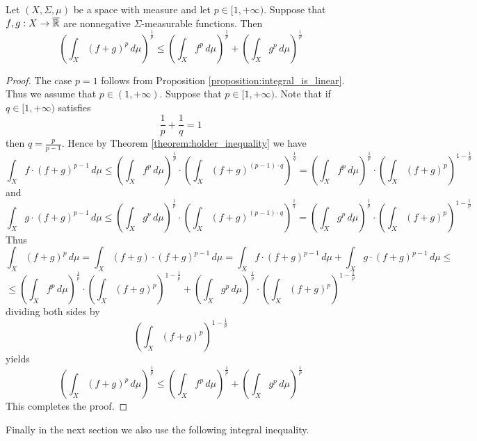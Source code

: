 \begin{corollary}[Minkowski]\label{corollary:Minkowski_inequality}
    Let $(X,\Sigma,\mu)$ be a space with measure and let $p \in [1,+\infty)$. Suppose that $f,g:X\rightarrow \overline{{\mathbb R}}$ are nonnegative $\Sigma$-measurable functions. Then
    $$\left(\int_X\left(f + g\right)^p\,d\mu\right)^{\frac{1}{p}} \leq \left(\int_X f^p\,d\mu\right)^{\frac{1}{p}} + \left(\int_X g^p\,d\mu\right)^{\frac{1}{p}}$$
\end{corollary}
\begin{proof}
    The case $p = 1$ follows from Proposition \ref{proposition:integral_is_linear}. Thus we assume that $p \in (1,+\infty)$. Suppose that $p \in [1,+\infty)$. Note that if $q \in [1,+\infty)$ satisfies
    $$\frac{1}{p} + \frac{1}{q} = 1$$
    then $q = \frac{p}{p-1}$. Hence by Theorem \ref{theorem:holder_inequality} we have
    $$\int_Xf \cdot \left(f + g\right)^{p-1}\,d\mu \leq \left(\int_X f^p\,d\mu\right)^{\frac{1}{p}}\cdot \left(\int_X\left(f + g\right)^{(p-1)\cdot q}\right)^{\frac{1}{q}} = \left(\int_X f^p\,d\mu\right)^{\frac{1}{p}}\cdot \left(\int_X\left(f + g\right)^{p}\right)^{1 - \frac{1}{p}}$$
    and
    $$\int_Xg \cdot \left(f + g\right)^{p-1}\,d\mu \leq \left(\int_X g^p\,d\mu\right)^{\frac{1}{p}}\cdot \left(\int_X\left(f + g\right)^{(p-1)\cdot q}\right)^{\frac{1}{q}} = \left(\int_X g^p\,d\mu\right)^{\frac{1}{p}}\cdot \left(\int_X\left(f + g\right)^{p}\right)^{1 - \frac{1}{p}}$$
    Thus
    $$\int_X\left(f+g\right)^p\,d\mu = \int_X\left(f + g\right)\cdot \left(f + g\right)^{p-1}\,d\mu = \int_Xf \cdot \left(f + g\right)^{p-1}\,d\mu + \int_Xg\cdot \left(f + g\right)^{p-1}\,d\mu \leq $$
    $$\leq \left(\int_X f^p\,d\mu\right)^{\frac{1}{p}}\cdot \left(\int_X\left(f + g\right)^{p}\right)^{1 - \frac{1}{p}} + \left(\int_X g^p\,d\mu\right)^{\frac{1}{p}}\cdot \left(\int_X\left(f + g\right)^{p}\right)^{1 - \frac{1}{p}}$$
    dividing both sides by
    $$\left(\int_X\left(f + g\right)^{p}\right)^{1 - \frac{1}{p}}$$
    yields
    $$\left(\int_X\left(f + g\right)^p\,d\mu\right)^{\frac{1}{p}} \leq \left(\int_X f^p\,d\mu\right)^{\frac{1}{p}} + \left(\int_X g^p\,d\mu\right)^{\frac{1}{p}}$$
    This completes the proof.
\end{proof}
\noindent
Finally in the next section we also use the following integral inequality.

